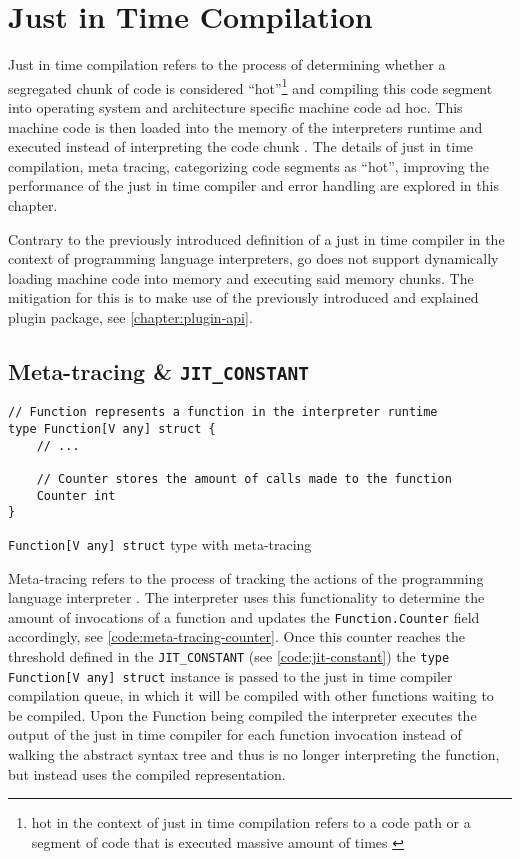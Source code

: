 \chapter{Just in Time Compilation}

Just in time compilation refers to the process of determining whether a
segregated chunk of code is considered ``hot''\footnote{hot in the context of
just in time compilation refers to a code path or a segment of code that is
executed massive amount of times \cite{jvm_ibm_optlevel, jvm_efficient}} and
compiling this code segment into operating system and architecture specific
machine code ad hoc. This machine code is then loaded into the memory of the
interpreters runtime and executed instead of interpreting the code chunk
\cite{jvm_efficient}. The details of just in time compilation, meta tracing,
categorizing code segments as ``hot'', improving the performance of the just in
time compiler and error handling are explored in this chapter.

Contrary to the previously introduced definition of a just in time compiler in
the context of programming language interpreters, go does not support
dynamically loading machine code into memory and executing said memory chunks.
The mitigation for this is to make use of the previously introduced and
explained plugin package, see \autoref{chapter:plugin-api}.

\section{Meta-tracing \& \texttt{JIT\_CONSTANT}}
\label{sec:meta-tracing-jit-constant}

\begin{listing}[H]
    \begin{verbatim}
// Function represents a function in the interpreter runtime
type Function[V any] struct {
    // ...

    // Counter stores the amount of calls made to the function
    Counter int
}
    \end{verbatim}
    \caption{\texttt{Function[V any] struct} type with meta-tracing}
    \label{code:meta-tracing-counter}
\end{listing}

Meta-tracing refers to the process of tracking the actions of the programming
language interpreter \cite[4.1 Meta-tracing]{bolz2015impact}. The interpreter
uses this functionality to determine the amount of invocations of a function
and updates the \texttt{Function.Counter} field accordingly, see
\autoref{code:meta-tracing-counter}. Once this counter reaches the threshold
defined in the \texttt{JIT\_CONSTANT} (see \autoref{code:jit-constant}) the
\texttt{type Function[V any] struct} instance is passed to the just in
time compiler compilation queue, in which it will be compiled with other
functions waiting to be compiled. Upon the Function being compiled the
interpreter executes the output of the just in time compiler for each function
invocation instead of walking the abstract syntax tree and thus is no longer
interpreting the function, but instead uses the compiled representation.

